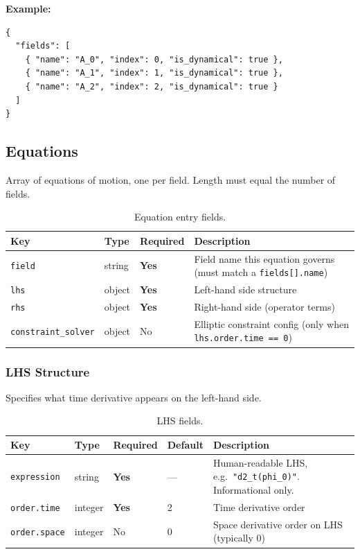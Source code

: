 \textbf{Example:}

\begin{lstlisting}[style=json]
{
  "fields": [
    { "name": "A_0", "index": 0, "is_dynamical": true },
    { "name": "A_1", "index": 1, "is_dynamical": true },
    { "name": "A_2", "index": 2, "is_dynamical": true }
  ]
}
\end{lstlisting}


\subsection{Equations}
\label{sec:json-equations}

Array of equations of motion, one per field. Length must equal the number of fields.

\begin{table}[htbp]
\centering
\caption{Equation entry fields.}
\label{tab:json-equations}
\begin{tabular}{@{}llll@{}}
\toprule
Key & Type & Required & Description \\
\midrule
\texttt{field}             & string & \textbf{Yes} & Field name this equation governs (must match a \texttt{fields[].name}) \\
\texttt{lhs}               & object & \textbf{Yes} & Left-hand side structure \\
\texttt{rhs}               & object & \textbf{Yes} & Right-hand side (operator terms) \\
\texttt{constraint\_solver} & object & No       & Elliptic constraint config (only when \texttt{lhs.order.time == 0}) \\
\bottomrule
\end{tabular}
\end{table}

\subsubsection{LHS Structure}
\label{sec:json-lhs}

Specifies what time derivative appears on the left-hand side.

\begin{table}[htbp]
\centering
\caption{LHS fields.}
\label{tab:json-lhs}
\begin{tabular}{@{}lllll@{}}
\toprule
Key & Type & Required & Default & Description \\
\midrule
\texttt{expression}  & string  & \textbf{Yes} & --- & Human-readable LHS, e.g.\ \texttt{"d2\_t(phi\_0)"}. Informational only. \\
\texttt{order.time}  & integer & \textbf{Yes} & 2   & Time derivative order \\
\texttt{order.space} & integer & No       & 0   & Space derivative order on LHS (typically 0) \\
\bottomrule
\end{tabular}
\end{table}


